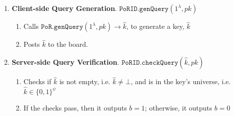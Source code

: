 \begin{enumerate}

\item\textbf{Client-side Query Generation}. $\mathtt{PoRID.genQuery}(1^{\lambda},  pk)$ 
\begin{enumerate}
\item Calls $\mathtt{PoR.genQuery}(1^{\lambda}, pk)\rightarrow \hat{k}$, to generate a key, $\hat{k}$ %
\item Posts $\hat{k}$ to the board. 
\end{enumerate}




\item\textbf{Server-side Query Verification}. $\mathtt{PoRID.checkQuery}(\hat{k}, pk)$
\begin{enumerate}
\item  Checks if  $\hat{k}$ is not empty, i.e. $\hat{k}\neq \bot$, and is in the key's universe, i.e. $\hat{k}\in \{0,1\}^{\scriptscriptstyle\psi}$%
\item  If the checks pass, then it outputs $b=1$; otherwise, it outputs $b=0$

\end{enumerate}
%


\end{enumerate}

